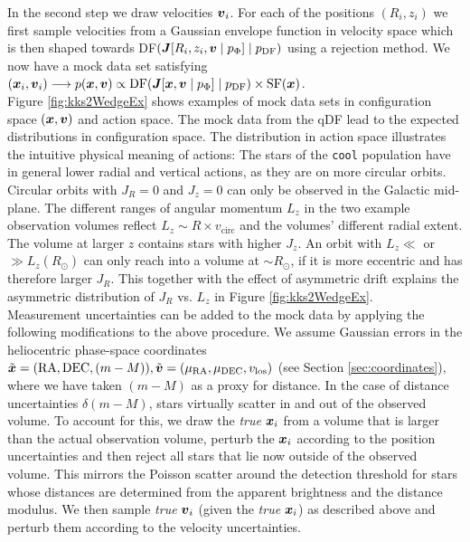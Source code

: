 In the second step we draw velocities $\boldsymbol{v}_i$. For each of the positions $(R_i,z_i)$ we first sample velocities from a Gaussian envelope function in velocity space which is then shaped towards DF$(\boldsymbol{J}[R_i,z_i,\boldsymbol{v} \mid p_{\Phi}] \mid p_\text{DF})$ using a rejection method. We now have a mock data set satisfying $(\boldsymbol{x}_i,\boldsymbol{v}_i) \longrightarrow p(\boldsymbol{x},\boldsymbol{v}) \propto \text{DF}(\boldsymbol{J}[\boldsymbol{x},\boldsymbol{v} \mid p_{\Phi}] \mid p_\text{DF}) \times \text{SF}(\boldsymbol{x})$.\\


Figure \ref{fig:kks2WedgeEx} shows examples of mock data sets in configuration space $(\boldsymbol{x},\boldsymbol{v})$ and action space. The mock data from the qDF lead to the expected distributions in configuration space. The distribution in action space illustrates the intuitive physical meaning of actions: The stars of the \texttt{cool} population have in general lower radial and vertical actions, as they are on more circular orbits. Circular orbits with $J_R = 0$ and $J_z = 0$ can only be observed in the Galactic mid-plane. The different ranges of angular momentum $L_z$ in the two example observation volumes reflect $L_z \sim R  \times v_\text{circ}$ and the volumes' different radial extent. The volume at larger $z$ contains stars with higher $J_z$.  An orbit with $L_z \ll$ or $\gg L_z(R_\odot)$ can only reach into a volume at $\sim R_\odot$, if it is more eccentric and has therefore larger $J_R$. This together with the effect of asymmetric drift explains the asymmetric distribution of $J_R$ vs. $L_z$ in Figure \ref{fig:kks2WedgeEx}.\\


Measurement uncertainties can be added to the mock data by applying the following modifications to the above procedure. We assume Gaussian errors in the heliocentric phase-space coordinates $\tilde{\boldsymbol{x}} = (\text{RA},\text{DEC},(m-M)), \tilde{\boldsymbol{v}} = (\mu_\text{RA},\mu_\text{DEC},v_\text{los})$ (see Section \ref{sec:coordinates}), where we have taken $(m-M)$ as a proxy for distance. In the case of distance uncertainties $\delta(m-M)$, stars virtually scatter in and out of the observed volume. To account for this, we draw the \emph{true} $\boldsymbol{x}_i$ from a volume that is larger than the actual observation volume, perturb the $\boldsymbol{x}_i$ according to the position uncertainties and then reject all stars that lie now outside of the observed volume. This mirrors the Poisson scatter around the detection threshold for stars whose distances are determined from the apparent brightness and the distance modulus. We then sample \emph{true} $\boldsymbol{v}_i$ (given the \emph{true} $\boldsymbol{x}_i$) as described above and perturb them according to the velocity uncertainties.

